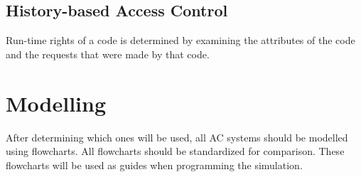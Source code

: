 \documentclass[11pt]{article} %
\begin{document}
\subsection{History-based Access Control}

Run-time rights of a code is determined by examining the attributes of the code and the requests that were made by that code.


\section{Modelling}

After determining which ones will be used, all AC systems should be modelled using flowcharts. All flowcharts should be standardized for comparison. These flowcharts will be used as guides when programming the simulation.
\end{document}
